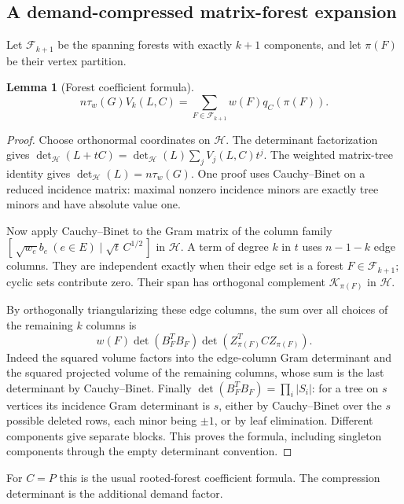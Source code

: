 \documentclass[11pt,a4paper]{article}
\newtheorem{lemma}[theorem]{Lemma}
\theoremstyle{definition}\newtheorem{definition}[theorem]{Definition}
\theoremstyle{remark}\newtheorem{remark}[theorem]{Remark}
\numberwithin{equation}{section}
\begin{document}
\subsection{A demand-compressed matrix-forest expansion}\label{T09-sec-2}
Let $\mathcal F_{k+1}$ be the spanning forests with exactly $k+1$ components, and let $\pi(F)$ be their vertex partition.
\begin{lemma}[Forest coefficient formula]\label{T09-forest}
\[
 n\tau_w(G)V_k(L,C)=\sum_{F\in\mathcal F_{k+1}}w(F)q_C(\pi(F)).
\]
\end{lemma}
\begin{proof}
Choose orthonormal coordinates on $\mathcal H$. The determinant factorization gives
$\det_{\mathcal H}(L+tC)=\det_{\mathcal H}(L)\sum_j V_j(L,C)t^j$.
The weighted matrix-tree identity gives $\det_{\mathcal H}(L)=n\tau_w(G)$. One proof uses Cauchy--Binet on a reduced incidence matrix: maximal nonzero incidence minors are exactly tree minors and have absolute value one.

Now apply Cauchy--Binet to the Gram matrix of the column family
$[\,\sqrt{w_e}b_e\ (e\in E)\mid\sqrt t\,C^{1/2}\,]$ in $\mathcal H$.
A term of degree $k$ in $t$ uses $n-1-k$ edge columns. They are independent exactly when their edge set is a forest $F\in\mathcal F_{k+1}$; cyclic sets contribute zero. Their span has orthogonal complement $\mathcal K_{\pi(F)}$ in $\mathcal H$.

By orthogonally triangularizing these edge columns, the sum over all choices of the remaining $k$ columns is
\[
 w(F)\det(B_F^TB_F)\det(Z_{\pi(F)}^TCZ_{\pi(F)}).
\]
Indeed the squared volume factors into the edge-column Gram determinant and the squared projected volume of the remaining columns, whose sum is the last determinant by Cauchy--Binet. Finally $\det(B_F^TB_F)=\prod_i|S_i|$: for a tree on $s$ vertices its incidence Gram determinant is $s$, either by Cauchy--Binet over the $s$ possible deleted rows, each minor being $\pm1$, or by leaf elimination. Different components give separate blocks. This proves the formula, including singleton components through the empty determinant convention.
\end{proof}
For $C=P$ this is the usual rooted-forest coefficient formula. The compression determinant is the additional demand factor.
\end{document}
